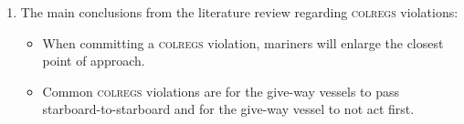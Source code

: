 \documentclass[twoside,symmetric,notoc]{tufte-book}
\begin{document}
{\begin{enumerate}
        \begin{itemize}
        \item In some areas, faster and more maneuverable ships will take the first action even when they are the stand-on vessel.
        \item A natural law is to pass astern of the other vessel in the most efficient manner possible.
    \end{itemize}
    \item The main conclusions from the literature review regarding \textsc{colregs} violations:
        \begin{itemize}
            \item When committing a \textsc{colregs} violation, mariners will enlarge the closest point of approach.
            \item Common \textsc{colregs} violations are for the give-way vessels to pass starboard-to-starboard and for the give-way vessel to not act first.
        \end{itemize}
\end{enumerate}
}

\end{document}
